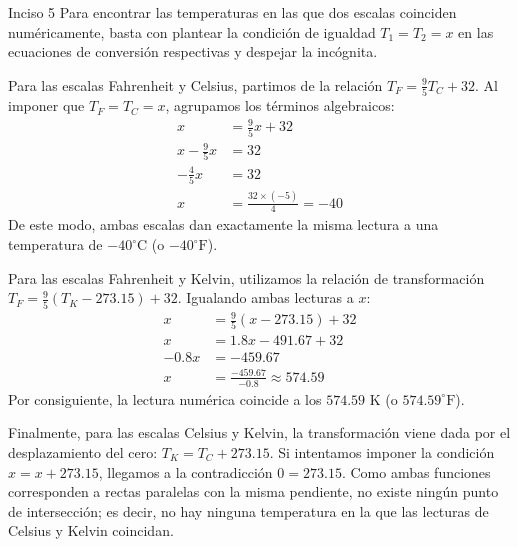 \documentclass[11pt,letterpaper]{article}
\begin{document}
\begin{inciso}{Inciso 5}
Para encontrar las temperaturas en las que dos escalas coinciden numéricamente, basta con plantear la condición de igualdad $T_1 = T_2 = x$ en las ecuaciones de conversión respectivas y despejar la incógnita.

Para las escalas Fahrenheit y Celsius, partimos de la relación $T_F = \frac{9}{5}T_C + 32$. Al imponer que $T_F = T_C = x$, agrupamos los términos algebraicos:
\begin{align*}
    x &= \frac{9}{5}x + 32 \\
    x - \frac{9}{5}x &= 32 \\
    -\frac{4}{5}x &= 32 \\
    x &= \frac{32 \times (-5)}{4} = -40
\end{align*}
De este modo, ambas escalas dan exactamente la misma lectura a una temperatura de $-40^\circ\text{C}$ (o $-40^\circ\text{F}$).

Para las escalas Fahrenheit y Kelvin, utilizamos la relación de transformación $T_F = \frac{9}{5}(T_K - 273.15) + 32$. Igualando ambas lecturas a $x$:
\begin{align*}
    x &= \frac{9}{5}(x - 273.15) + 32 \\
    x &= 1.8x - 491.67 + 32 \\
    -0.8x &= -459.67 \\
    x &= \frac{-459.67}{-0.8} \approx 574.59
\end{align*}
Por consiguiente, la lectura numérica coincide a los $574.59\text{ K}$ (o $574.59^\circ\text{F}$).

Finalmente, para las escalas Celsius y Kelvin, la transformación viene dada por el desplazamiento del cero: $T_K = T_C + 273.15$. Si intentamos imponer la condición $x = x + 273.15$, llegamos a la contradicción $0 = 273.15$. Como ambas funciones corresponden a rectas paralelas con la misma pendiente, no existe ningún punto de intersección; es decir, no hay ninguna temperatura en la que las lecturas de Celsius y Kelvin coincidan.
\end{inciso}
\end{document}
